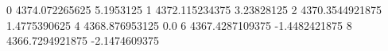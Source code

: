 0 4374.072265625 5.1953125
1 4372.115234375 3.23828125
2 4370.3544921875 1.4775390625
4 4368.876953125 0.0
6 4367.4287109375 -1.4482421875
8 4366.7294921875 -2.1474609375

